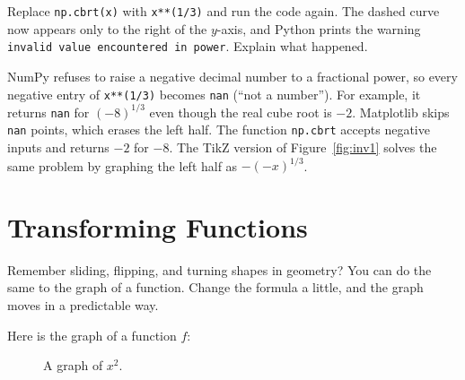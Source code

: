 \begin{Exercise}[title={The missing half}, label={ex:functions-python-3}]
  Replace \texttt{np.cbrt(x)} with
  \texttt{x**(1/3)} and run the code again. The dashed curve now
  appears only to the right of the $y$-axis, and Python prints the warning
  \texttt{invalid value encountered in power}. Explain what
  happened.
\end{Exercise}
\begin{Answer}[ref={ex:functions-python-3}]
  NumPy refuses to raise a negative decimal number to a fractional power, so
  every negative entry of \texttt{x**(1/3)} becomes
  \texttt{nan} (``not a number''). For example, it returns
  \texttt{nan} for $(-8)^{1/3}$ even though the real cube root is
  $-2$. Matplotlib skips \texttt{nan} points, which erases the
  left half. The function \texttt{np.cbrt} accepts negative
  inputs and returns $-2$ for $-8$. The TikZ version of
  Figure~\ref{fig:inv1} solves the same problem by graphing the left half as
  $-(-x)^{1/3}$.
\end{Answer}

\section{Transforming Functions}
Remember sliding, flipping, and turning shapes in geometry? You can do the
same to the graph of a function. Change the formula a little, and the graph
moves in a predictable way.

Here is the graph of a function $f$:
\begin{figure}[H]
    \centering
    \caption{A graph of $x^2$.}
    \label{fig:graphNoShift}
\end{figure}

